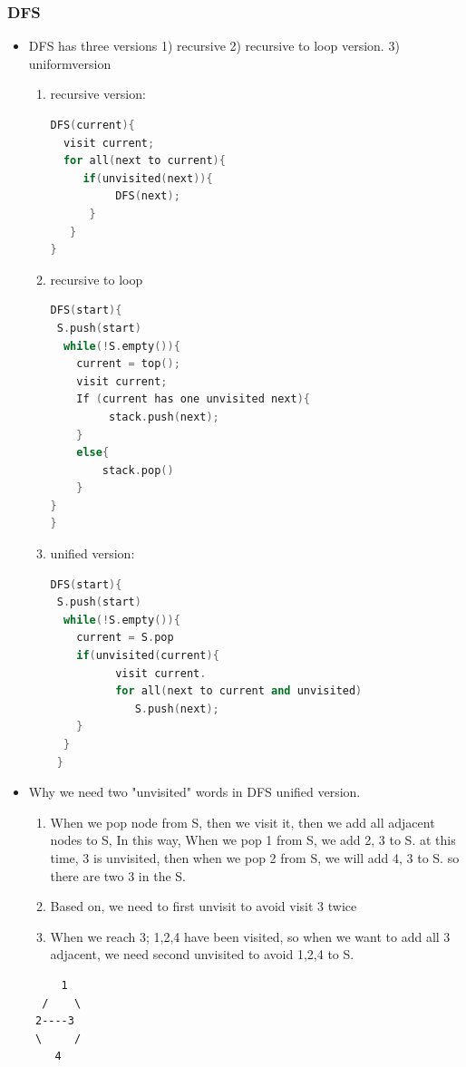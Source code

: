 \documentclass[a4paper,12pt,twoside]{book}
\begin{document}
\subsubsection{DFS}
\begin{itemize}
\item DFS has three versions 1) recursive 2) recursive to loop version. 3) uniformversion
\begin{enumerate}
\item recursive version:
\begin{lstlisting}[frame=single, language=c++]
DFS(current){
  visit current;
  for all(next to current){
     if(unvisited(next)){
          DFS(next);
      }
   }
}
\end{lstlisting} 
\item recursive to loop
\begin{lstlisting}[frame=single, language=c++]
DFS(start){
 S.push(start)  
  while(!S.empty()){
    current = top();
    visit current;
    If (current has one unvisited next){ 
         stack.push(next);
    }   
    else{
        stack.pop()
    }
}
}
\end{lstlisting} 
\item unified version:
\begin{lstlisting}[frame=single, language=c++]
DFS(start){
 S.push(start)  
  while(!S.empty()){
    current = S.pop
    if(unvisited(current){
          visit current.
          for all(next to current and unvisited)
             S.push(next);
    }
  }
 }
\end{lstlisting} 
\end{enumerate}

\item  Why we need two "unvisited" words in DFS unified version.  
\begin{enumerate}
\item When we pop node from S, then we visit it, then we add all adjacent nodes to S, In this way, When we pop 1 from S, we add 2, 3 to S. at this time, 3 is unvisited, then when we pop 2 from S, we will add 4, 3 to S. so there are two 3 in the S. 
\item Based on, we need to first unvisit to avoid visit 3 twice

\item When we reach 3; 1,2,4 have been visited, so when we want to add all 3 adjacent, we need second unvisited to avoid 1,2,4 to S.  
\end{enumerate}
\begin{verbatim}
     1
  /    \
 2----3
 \     /
    4      
\end{verbatim}


\end{itemize}
\end{document}

